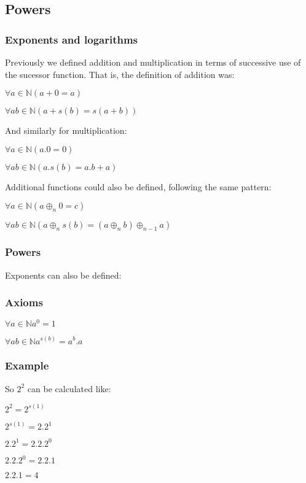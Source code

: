 \subsection{Powers}

\subsubsection{Exponents and logarithms}

Previously we defined addition and multiplication in terms of successive use of the sucessor function. That is, the definition of addition was:

$\forall a \in \mathbb{N} (a+0=a)$

$\forall a b \in \mathbb{N} (a+s(b)=s(a+b))$

And similarly for multiplication:

$\forall a \in \mathbb{N} (a.0=0)$

$\forall a b \in \mathbb{N} (a.s(b)=a.b+a)$

Additional functions could also be defined, following the same pattern:

$\forall a \in \mathbb{N} (a\oplus _n 0=c)$

$\forall a b \in \mathbb{N} (a\oplus _{n} s(b)=(a\oplus_{n} b)\oplus_{n-1}a)$

\subsubsection{Powers}

Exponents can also be defined:

\subsubsection{Axioms}

$\forall a \in \mathbb{N} a^0=1$

$\forall a b \in \mathbb{N} a^{s(b)}=a^b.a$

\subsubsection{Example}

So \(2^2\) can be calculated like:

$2^2=2^{s(1)}$

$2^{s(1)}=2.2^1$

$2.2^1=2.2.2^0$

$2.2.2^0=2.2.1$

$2.2.1=4$

